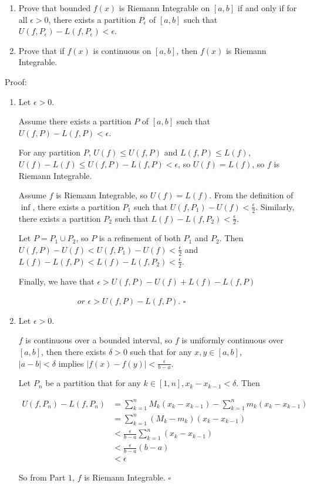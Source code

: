 \documentclass{article}
\begin{document}
\begin{enumerate}
\item Prove that bounded $f(x)$ is Riemann Integrable on $[a,b]$ if and only if for all $\epsilon>0$, there exists a partition $P_\epsilon$ of $[a,b]$ such that \\$U(f,P_\epsilon)-L(f,P_\epsilon)<\epsilon$.
\item Prove that if $f(x)$ is continuous on $[a,b]$, then $f(x)$ is Riemann Integrable.

\end{enumerate}

Proof:

\begin{enumerate}
    \item Let $\epsilon > 0$.
    
    Assume there exists a partition $P$ of $[a,b]$ such that $U(f, P) - L(f, P) < \epsilon$.

    For any partition $P$, $U(f) \le U(f,P)$ and $L(f,P) \le L(f)$, \\ $U(f) - L(f) \le U(f,P) - L(f,P) < \epsilon$, so $U(f) = L(f)$, so $f$ is Riemann Integrable.

    Assume $f$ is Riemann Integrable, so $U(f) = L(f)$. From the definition of $\inf$, there exists a partition $P_1$ such that $U(f, P_1) - U(f) < \frac{\epsilon}{2}$. Similarly, there exists a partition $P_2$ such that $L(f) - L(f, P_2) < \frac{\epsilon}{2}$. 

    Let $P = P_1 \cup P_2$, so $P$ is a refinement of both $P_1$ and $P_2$. Then \\$U(f, P) - U(f) < U(f, P_1) - U(f) < \frac{\epsilon}{2}$ and \\$L(f) - L(f, P) < L(f) - L(f, P_2) < \frac{\epsilon}{2}$. 
    
    Finally, we have that $\epsilon > U(f, P) - U(f) + L(f) - L(f, P)$
    
    $\hspace{3cm}\textit{or } \epsilon > U(f,P) - L(f,P)$. $\square$

    \item Let $\epsilon > 0$.

    $f$ is continuous over a bounded interval, so $f$ is uniformly continuous over $[a,b]$, then there exists $\delta > 0$ such that for any $x, y \in [a,b]$, \\$|a-b| < \delta$ implies $|f(x) -f(y)| < \frac{\epsilon}{b-a}$.

    Let $P_n$ be a partition that for any $k \in [1,n], x_{k} - x_{k-1} < \delta$. Then 

    \begin{align*}
    U(f, P_n) - L(f, P_n) & = \sum\limits^n_{k=1} M_k (x_k - x_{k-1})- \sum\limits^n_{k=1} m_k (x_k - x_{k-1})\\
    & = \sum\limits^n_{k=1} (M_k - m_k) (x_k - x_{k-1})\\
    & < \frac{\epsilon}{b-a} \sum\limits^n_{k=1} (x_k - x_{k-1})\\
    & < \frac{\epsilon}{b-a} (b-a)\\
    & < \epsilon 
    \end{align*}

    So from Part $1$, $f$ is Riemann Integrable. $\square$
\end{enumerate}
\end{document}
